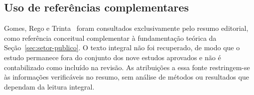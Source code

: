 \subsection{Uso de referências complementares}\label{sec:fontes-complementares}

Gomes, Rego e Trinta~ foram consultados exclusivamente
pelo resumo editorial, como referência conceitual complementar à
fundamentação teórica da Seção~\ref{sec:setor-publico}. O texto integral
não foi recuperado, de modo que o estudo permanece fora do conjunto dos
nove estudos aprovados e não é contabilizado como incluído na revisão.
As atribuições a essa fonte restringem-se às informações verificáveis no
resumo, sem análise de métodos ou resultados que dependam da leitura
integral.

\FloatBarrier
